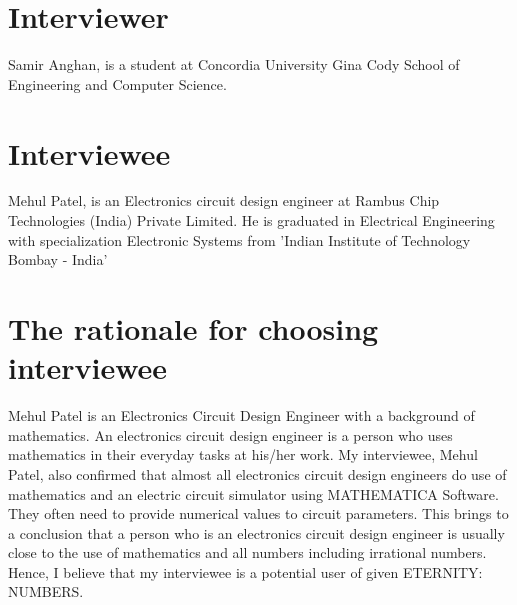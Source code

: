 \section{Interviewer}
Samir Anghan, is a student at Concordia University Gina Cody School of Engineering and Computer Science.\par

\section{Interviewee}
Mehul Patel, is an Electronics circuit design engineer at Rambus Chip Technologies (India) Private Limited. He is graduated in Electrical Engineering with specialization Electronic Systems from 'Indian Institute of Technology Bombay - India'\par

\section{The rationale for choosing interviewee}
Mehul Patel is an Electronics Circuit Design Engineer with a background of mathematics. An electronics circuit design engineer is a person who uses mathematics in their everyday tasks at his/her work. My interviewee, Mehul Patel, also confirmed that almost all electronics circuit design engineers do use of mathematics and an electric circuit simulator using MATHEMATICA Software. They often need to provide numerical values to circuit parameters. This brings to a conclusion that a person who is an electronics circuit design engineer is usually close to the use of mathematics and all numbers including irrational numbers. Hence, I believe that my interviewee is a potential user of given ETERNITY: NUMBERS.

